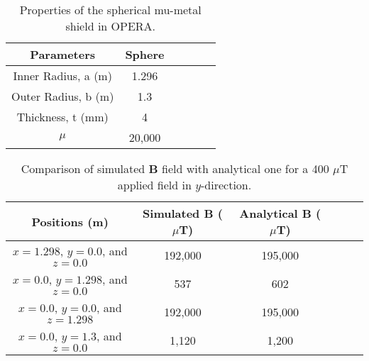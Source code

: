 \begin{table} [!htb]
    \centering
    \begin{tabular} { |c|c|c|c|c|c|} 
        \hline
        Parameters & Sphere \\
        \hline\hline
        Inner Radius, a (m) & 1.296\\ 
        \hline
        Outer Radius, b (m) & 1.3 \\ 
        \hline
        Thickness, t (mm) & 4 \\ 
        \hline
        $\mu$  & 20,000 \\ 
        \hline

    \end{tabular}
    \caption{Properties of the spherical mu-metal shield in OPERA.}\label{tablE:opera_sphere}
\end{table}

\begin{table} [!htb]
    \centering
    \begin{tabular} { |c|c|c|c|c|c|} 
        \hline
        Positions (m) & Simulated $\bm{B}$ ($\mu$T) & Analytical $\bm{B}$ ($\mu$T)\\
        \hline\hline
        $x=1.298$, $y=0.0$, and $z=0.0$ & 192,000 & 195,000\\ 
        \hline
        $x=0.0$, $y=1.298$, and $z=0.0$ & 537 & 602\\ 
        \hline
        $x=0.0$, $y=0.0$, and $z=1.298$ & 192,000 & 195,000\\ 
        \hline
        $x=0.0$, $y=1.3$, and $z=0.0$ & 1,120 & 1,200\\ 
        \hline

    \end{tabular}
    \caption[Comparison of simulated $\bm{B}$ field with analytical one ]{Comparison of simulated $\bm{B}$ field with analytical one for a 400 $\mu$T applied field in $y$-direction.}\label{tablE:opera_analytical}
\end{table}

